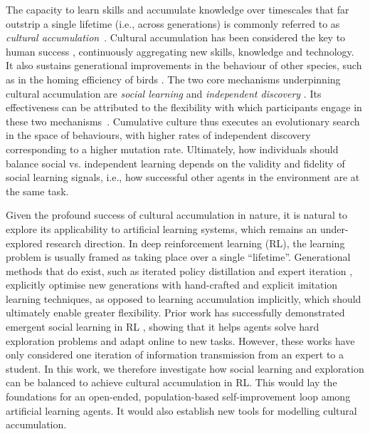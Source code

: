 \documentclass{article}
\begin{document}
The capacity to learn skills and accumulate knowledge over timescales that far outstrip a single lifetime (i.e., across generations) is commonly referred to as \textit{cultural accumulation}~\citep{Hofstede94, Tennie09}. Cultural accumulation has been considered the key to human success \citep{Henrich19}, continuously aggregating new skills, knowledge and technology. It also sustains generational improvements in the behaviour of other species, such as in the homing efficiency of birds \citep{sasaki17}. The two core mechanisms underpinning cultural accumulation are \textit{social learning} \citep{bandura1977social, hoppitt2013social} and \textit{independent discovery} \citep{mesoudi2011variable}. Its effectiveness can be attributed to the flexibility with which participants engage in these two mechanisms~\citep{enquist08, rendell2010copy, mesoudi2018cumulative}. Cumulative culture thus executes an evolutionary search in the space of behaviours, with higher rates of independent discovery corresponding to a higher mutation rate. Ultimately, how individuals should balance social vs. independent learning depends on the validity and fidelity of social learning signals, i.e., how successful other agents in the environment are at the same task.

Given the profound success of cultural accumulation in nature, it is natural to explore its applicability to artificial learning systems, which remains an under-explored research direction. In deep reinforcement learning (RL), the learning problem is usually framed as taking place over a single ``lifetime''. Generational methods that do exist, such as iterated policy distillation \citep{schmitt2018kickstarting, Stooke21} and expert iteration \citep{anthony2017thinking}, explicitly optimise new generations with hand-crafted and explicit imitation learning techniques, as opposed to learning accumulation implicitly, which should ultimately enable greater flexibility. Prior work has successfully demonstrated emergent social learning in RL \citep{borsa2017observational, Ndousse21, bhoopchand23}, showing that it helps agents solve hard exploration problems and adapt online to new tasks. However, these works have only considered one iteration of information transmission from an expert to a student. In this work, we therefore investigate how social learning and exploration can be balanced to achieve cultural accumulation in RL. This would lay the foundations for an open-ended, population-based self-improvement loop among artificial learning agents. It would also establish new tools for modelling cultural accumulation.
\end{document}
